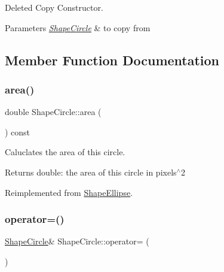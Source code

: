 Deleted Copy Constructor. 


\begin{DoxyParams}{Parameters}
{\em \mbox{\hyperlink{class_shape_circle}{Shape\+Circle}}} & to copy from \\
\hline
\end{DoxyParams}


\subsection{Member Function Documentation}
\mbox{\label{class_shape_circle_aebc30fb4ad7165778deb75f0bd2d69bd}} 
\subsubsection{\texorpdfstring{area()}{area()}}
{\footnotesize\ttfamily double Shape\+Circle\+::area (\begin{DoxyParamCaption}{ }\end{DoxyParamCaption}) const\hspace{0.3cm}{\ttfamily [virtual]}}



Caluclates the area of this circle. 

\begin{DoxyReturn}{Returns}
double\+: the area of this circle in pixels$^\wedge$2 
\end{DoxyReturn}


Reimplemented from \mbox{\hyperlink{class_shape_ellipse_a08287b301b7501eb941805eaf85fc00c}{Shape\+Ellipse}}.

\mbox{\label{class_shape_circle_ac3c25bd9c3ab31cd8001c33d79b88409}} 
\subsubsection{\texorpdfstring{operator=()}{operator=()}}
{\footnotesize\ttfamily \mbox{\hyperlink{class_shape_circle}{Shape\+Circle}}\& Shape\+Circle\+::operator= (\begin{DoxyParamCaption}\item[{const \mbox{\hyperlink{class_shape_circle}{Shape\+Circle}} \&}]{ }\end{DoxyParamCaption})\hspace{0.3cm}{\ttfamily [delete]}}



